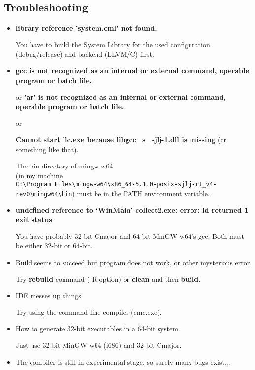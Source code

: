 \documentclass[oneside, a4paper, 11pt]{article}
\begin{document}
\subsection{Troubleshooting}

\begin{itemize}

\item
\textbf{library reference 'system.cml' not found.}

You have to build the System Library for the used configuration (debug/release) and backend (LLVM/C) first.

\item

\textbf{gcc is not recognized as an internal or external command, operable program or batch file.}

or \textbf{'ar' is not recognized as an internal or external command, operable program or batch file.}

or

\textbf{Cannot start llc.exe because libgcc\_s\_sjlj-1.dll is missing} (or something like that).

The bin directory of mingw-w64\\
(in my machine\\
\verb|C:\Program Files\mingw-w64\x86_64-5.1.0-posix-sjlj-rt_v4-rev0\mingw64\bin|)
must be in the PATH environment variable.

\item
\textbf{undefined reference to `WinMain' collect2.exe: error: ld returned 1 exit status}

You have probably 32-bit Cmajor and 64-bit MinGW-w64's gcc.
Both must be either 32-bit or 64-bit.

\item
Build seems to succeed but program does not work, or other mysterious error.

Try \textbf{rebuild} command (-R option) or \textbf{clean} and then \textbf{build}.

\item
IDE messes up things.

Try using the command line compiler (cmc.exe).

\item
How to generate 32-bit executables in a 64-bit system.

Just use 32-bit MinGW-w64 (i686) and 32-bit Cmajor.

\item
The compiler is still in experimental stage, so surely many bugs exist...

\end{itemize}
\end{document}
